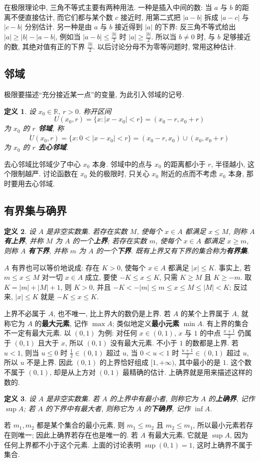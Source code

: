 \documentclass[UTF8,openany]{ctexbook}
\theoremstyle{chinesetextbook}
\newtheorem{definition}{定义}[section]
\begin{document}
在极限理论中, 三角不等式主要有两种用法. 一种是插入中间的数: 当 $a$ 与 $b$ 的距离不便直接估计, 而它们都与某个数 $c$ 接近时, 用第二式把 $|a-b|$ 拆成 $|a-c|$ 与 $|c-b|$ 分别估计. 另一种是由 $a$ 与 $b$ 接近得到 $|a|$ 的下界: 反三角不等式给出 $|a|\ge|b|-|a-b|$, 例如当 $\displaystyle|a-b|\le\frac{|b|}2$ 时 $\displaystyle|a|\ge\frac{|b|}2$. 所以当 $b\ne0$ 时, 与 $b$ 足够接近的数, 其绝对值有正的下界 $\displaystyle\frac{|b|}2$. 以后讨论分母不为零等问题时, 常用这种估计.
\subsection{邻域}
极限要描述“充分接近某一点”的变量, 为此引入邻域的记号.
\begin{definition}
设 $x_0\in\mathbb R$, $r>0$. 称开区间
\[
U(x_0,r)=\{x:|x-x_0|<r\}=(x_0-r,x_0+r)
\]
为 $x_0$ 的 \textbf{$r$ 邻域}, 称
\[
\mathring U(x_0,r)=\{x:0<|x-x_0|<r\}=(x_0-r,x_0)\cup(x_0,x_0+r)
\]
为 $x_0$ 的 \textbf{$r$ 去心邻域}.
\end{definition}
去心邻域比邻域少了中心 $x_0$ 本身. 邻域中的点与 $x_0$ 的距离都小于 $r$, 半径越小, 这个限制越严. 讨论函数在 $x_0$ 处的极限时, 只关心 $x_0$ 附近的点而不考虑 $x_0$ 本身, 那时要用去心邻域.
\subsection{有界集与确界}
\begin{definition}
设 $A$ 是非空实数集. 若存在实数 $M$, 使每个 $x\in A$ 都满足 $x\le M$, 则称 $A$ \textbf{有上界}, 并称 $M$ 为 $A$ 的一个\textbf{上界}; 若存在实数 $m$, 使每个 $x\in A$ 都满足 $x\ge m$, 则称 $A$ \textbf{有下界}, 并称 $m$ 为 $A$ 的一个\textbf{下界}. 既有上界又有下界的集合称为\textbf{有界集}.
\end{definition}
$A$ 有界也可以等价地说成: 存在 $K>0$, 使每个 $x\in A$ 都满足 $|x|\le K$. 事实上, 若 $m\le x\le M$ 对一切 $x\in A$ 成立, 要使 $-K\le x\le K$, 只需 $K\ge M$ 且 $K\ge-m$. 取 $K=|m|+|M|+1$, 则 $K>0$, 并且 $-K<-|m|\le m\le x\le M\le|M|<K$; 反过来, $|x|\le K$ 就是 $-K\le x\le K$.

上界不必属于 $A$, 也不唯一, 比上界大的数仍是上界. 若 $A$ 的某个上界属于 $A$, 就称它为 $A$ 的\textbf{最大元素}, 记作 $\max A$; 类似地定义\textbf{最小元素} $\min A$. 有上界的集合不一定有最大元素. 以 $(0,1)$ 为例: 对任何 $x\in(0,1)$, $x$ 与 $1$ 的中点 $\displaystyle\frac{x+1}2$ 仍属于 $(0,1)$ 且大于 $x$, 所以 $(0,1)$ 没有最大元素. 不小于 $1$ 的数都是上界. 若 $u<1$, 则当 $u\le0$ 时 $\displaystyle\frac12\in(0,1)$ 超过 $u$, 当 $0<u<1$ 时 $\displaystyle\frac{u+1}2\in(0,1)$ 超过 $u$, 所以 $u$ 不是上界. 因此 $(0,1)$ 的上界恰好组成 $[1,+\infty)$, 其中最小的是 $1$. 这个数不属于 $(0,1)$, 却是从上方对 $(0,1)$ 最精确的估计. 上确界就是用来描述这样的数的.
\begin{definition}
设 $A$ 是非空实数集. 若 $A$ 的上界中有最小者, 则称它为 $A$ 的\textbf{上确界}, 记作 $\sup A$; 若 $A$ 的下界中有最大者, 则称它为 $A$ 的\textbf{下确界}, 记作 $\inf A$.
\end{definition}
若 $m_1,m_2$ 都是某个集合的最小元素, 则 $m_1\le m_2$ 且 $m_2\le m_1$, 所以最小元素若存在则唯一; 因此上确界若存在也是唯一的. 若 $A$ 有最大元素, 它就是 $\sup A$, 因为任何上界都不小于这个元素. 上面的讨论表明 $\sup(0,1)=1$, 这时上确界不属于集合.
\end{document}
